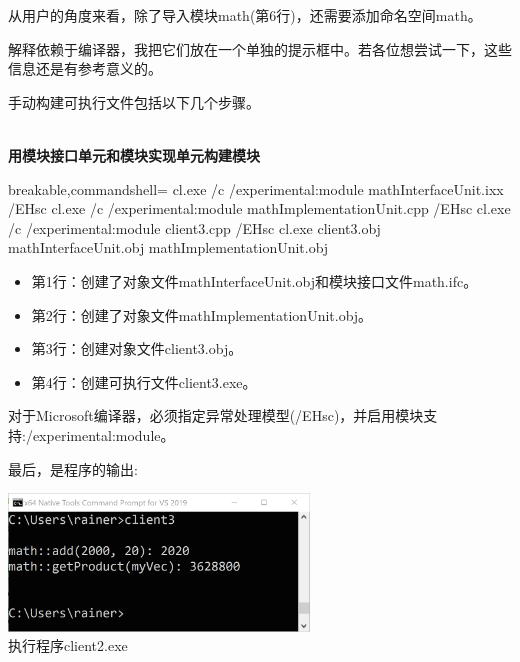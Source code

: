 从用户的角度来看，除了导入模块math(第6行)，还需要添加命名空间math。

解释依赖于编译器，我把它们放在一个单独的提示框中。若各位想尝试一下，这些信息还是有参考意义的。


\begin{tcolorbox}[breakable,enhanced jigsaw,colback=blue!5!white,colframe=blue!75!black,title={使用Microsoft编译器构建可执行文件}]
	
手动构建可执行文件包括以下几个步骤。

\hspace*{\fill} \\ %
\noindent
\textbf{用模块接口单元和模块实现单元构建模块}
\begin{tcblisting}{breakable,commandshell={}}
cl.exe /c /experimental:module mathInterfaceUnit.ixx /EHsc
cl.exe /c /experimental:module mathImplementationUnit.cpp /EHsc
cl.exe /c /experimental:module client3.cpp /EHsc
cl.exe client3.obj mathInterfaceUnit.obj mathImplementationUnit.obj
\end{tcblisting}

\begin{itemize}
\item 
第1行：创建了对象文件mathInterfaceUnit.obj和模块接口文件math.ifc。

\item 
第2行：创建了对象文件mathImplementationUnit.obj。

\item 
第3行：创建对象文件client3.obj。

\item 
第4行：创建可执行文件client3.exe。
\end{itemize}

对于Microsoft编译器，必须指定异常处理模型(/EHsc)，并启用模块支持:/experimental:module。

最后，是程序的输出:

\begin{center}
\includegraphics[width=0.6\textwidth]{content/3/chapter4/images/20.png}\\
执行程序client2.exe
\end{center}
\end{tcolorbox}

